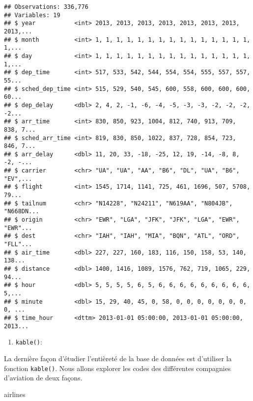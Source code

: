 \documentclass[]{book}
\newenvironment{Shaded}{\begin{snugshade}}{\end{snugshade}}
\newcommand{\NormalTok}[1]{#1}
\providecommand{\tightlist}{%
  \setlength{\itemsep}{0pt}\setlength{\parskip}{0pt}}
\begin{document}
\begin{verbatim}
## Observations: 336,776
## Variables: 19
## $ year           <int> 2013, 2013, 2013, 2013, 2013, 2013, 2013, 2013,...
## $ month          <int> 1, 1, 1, 1, 1, 1, 1, 1, 1, 1, 1, 1, 1, 1, 1, 1,...
## $ day            <int> 1, 1, 1, 1, 1, 1, 1, 1, 1, 1, 1, 1, 1, 1, 1, 1,...
## $ dep_time       <int> 517, 533, 542, 544, 554, 554, 555, 557, 557, 55...
## $ sched_dep_time <int> 515, 529, 540, 545, 600, 558, 600, 600, 600, 60...
## $ dep_delay      <dbl> 2, 4, 2, -1, -6, -4, -5, -3, -3, -2, -2, -2, -2...
## $ arr_time       <int> 830, 850, 923, 1004, 812, 740, 913, 709, 838, 7...
## $ sched_arr_time <int> 819, 830, 850, 1022, 837, 728, 854, 723, 846, 7...
## $ arr_delay      <dbl> 11, 20, 33, -18, -25, 12, 19, -14, -8, 8, -2, -...
## $ carrier        <chr> "UA", "UA", "AA", "B6", "DL", "UA", "B6", "EV",...
## $ flight         <int> 1545, 1714, 1141, 725, 461, 1696, 507, 5708, 79...
## $ tailnum        <chr> "N14228", "N24211", "N619AA", "N804JB", "N668DN...
## $ origin         <chr> "EWR", "LGA", "JFK", "JFK", "LGA", "EWR", "EWR"...
## $ dest           <chr> "IAH", "IAH", "MIA", "BQN", "ATL", "ORD", "FLL"...
## $ air_time       <dbl> 227, 227, 160, 183, 116, 150, 158, 53, 140, 138...
## $ distance       <dbl> 1400, 1416, 1089, 1576, 762, 719, 1065, 229, 94...
## $ hour           <dbl> 5, 5, 5, 5, 6, 5, 6, 6, 6, 6, 6, 6, 6, 6, 6, 5,...
## $ minute         <dbl> 15, 29, 40, 45, 0, 58, 0, 0, 0, 0, 0, 0, 0, 0, ...
## $ time_hour      <dttm> 2013-01-01 05:00:00, 2013-01-01 05:00:00, 2013...
\end{verbatim}

\begin{enumerate}
\def\labelenumi{\arabic{enumi}.}
\setcounter{enumi}{2}
\tightlist
\item
  \texttt{kable()}:
\end{enumerate}

La dernière façon d'étudier l'entièreté de la base de données est
d'utiliser la fonction \texttt{kable()}. Nous allons explorer les codes
des différentes compagnies d'aviation de deux façons.

\begin{Shaded}
\begin{Highlighting}[]
\NormalTok{airlines}
\end{Highlighting}
\end{Shaded}
\end{document}
